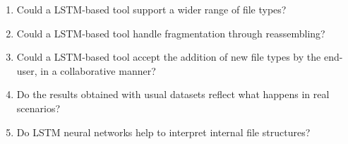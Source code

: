 \begin{enumerate}[itemindent=\parindent,label=\textbf{Q\arabic*.}]

    \item Could a LSTM-based tool support a wider range of file types?
    
    \item Could a LSTM-based tool handle fragmentation through reassembling?
    
    \item Could a LSTM-based tool accept the addition of new file types by the end-user, in a collaborative manner? 


    \item Do the results obtained with usual datasets reflect what happens in real scenarios?

    \item Do LSTM neural networks help to interpret internal file structures?

\end{enumerate}

